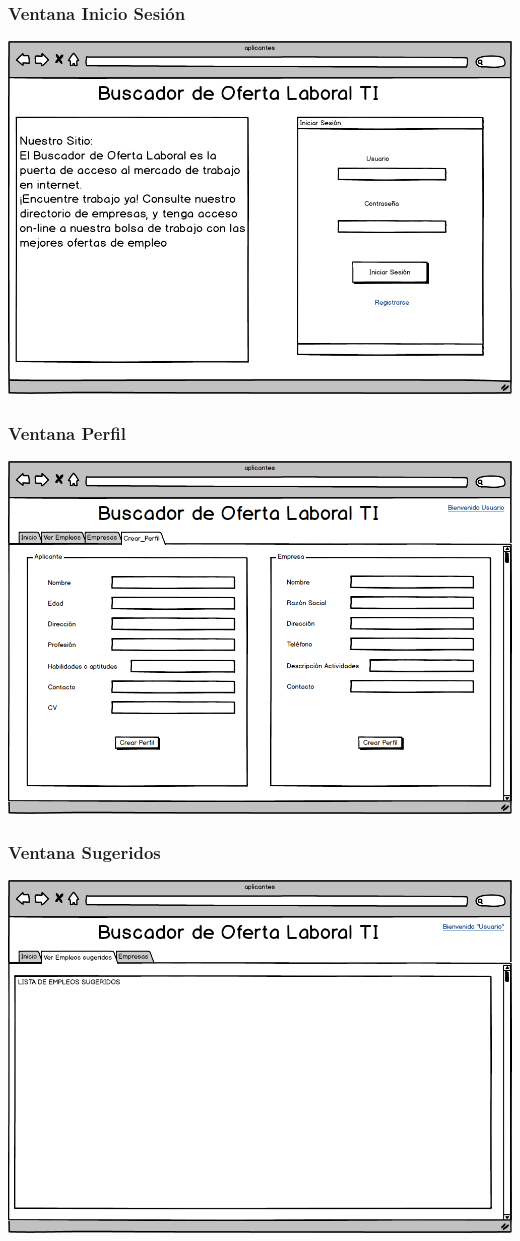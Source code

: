 \frame
{
  \frametitle{  Ventana Inicio Sesión}
  \begin{center}
		\includegraphics[scale=0.28]{./resources/04inicio.png}
  \end{center}
}


\frame
{
  \frametitle{  Ventana Perfil}
  \begin{center}
		\includegraphics[scale=0.28]{./resources/06perfil.png}
  \end{center}
}

\frame
{
  \frametitle{  Ventana Sugeridos}
  \begin{center}
		\includegraphics[scale=0.28]{./resources/08sugeridos.png}
  \end{center}
}

